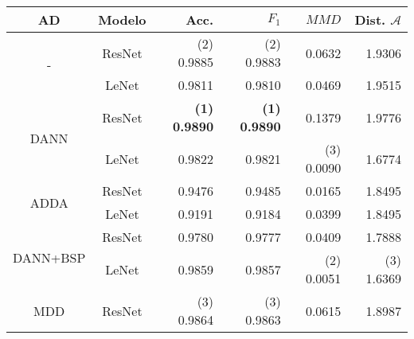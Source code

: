 \begin{table}[H]
    \centering
    \begin{tabular}{cc|rr|rr}
        \toprule
        AD                           & Modelo & Acc.                                & $F_1$                               & $MMD$                               & Dist. $\mathcal{A}$                 \\
        \midrule
        \multirow[c]{2}{*}{-}        & ResNet & {\footnotesize (2)} 0.9885          & {\footnotesize (2)} 0.9883          & 0.0632                              & 1.9306                              \\
                                     & LeNet  & 0.9811                              & 0.9810                              & 0.0469                              & 1.9515                              \\\hline
        \multirow[c]{2}{*}{DANN}     & ResNet & \textbf{{\footnotesize (1)} 0.9890} & \textbf{{\footnotesize (1)} 0.9890} & 0.1379                              & 1.9776                              \\
                                     & LeNet  & 0.9822                              & 0.9821                              & {\footnotesize (3)} 0.0090          & 1.6774                              \\\hline
        \multirow[c]{2}{*}{ADDA}     & ResNet & 0.9476                              & 0.9485                              & 0.0165                              & 1.8495                              \\
                                     & LeNet  & 0.9191                              & 0.9184                              & 0.0399                              & 1.8495                              \\\hline
        \multirow[c]{2}{*}{DANN+BSP} & ResNet & 0.9780                              & 0.9777                              & 0.0409                              & 1.7888                              \\
                                     & LeNet  & 0.9859                              & 0.9857                              & {\footnotesize (2)} 0.0051          & {\footnotesize (3)} 1.6369          \\\hline
        \multirow[c]{2}{*}{MDD}      & ResNet & {\footnotesize (3)} 0.9864          & {\footnotesize (3)} 0.9863          & 0.0615                              & 1.8987                              \\

\end{tabular}
\end{table}
